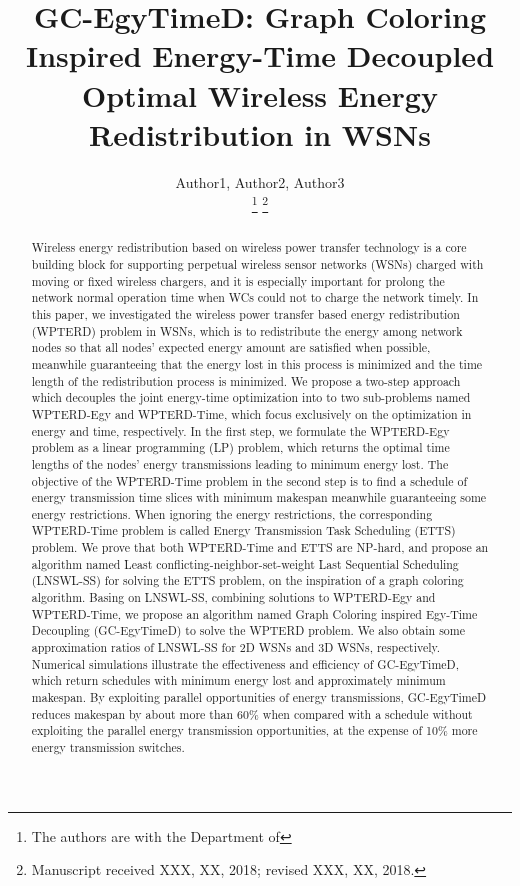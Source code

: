 \documentclass[journal,10pt]{IEEEtran}
\begin{document}
\title{GC-EgyTimeD: Graph Coloring Inspired Energy-Time Decoupled Optimal Wireless Energy Redistribution in WSNs}


\author{Author1, Author2, Author3

\thanks{The authors are with the Department of }%
\thanks{Manuscript received XXX, XX, 2018; revised XXX, XX, 2018.}}

{}


\maketitle


\begin{abstract}
Wireless energy redistribution based on wireless power transfer technology is a core building block for supporting perpetual wireless sensor networks (WSNs) charged with moving or fixed wireless chargers, and it is especially important for prolong the network normal operation time when WCs could not to charge the network timely. In this paper, we investigated the wireless power transfer based energy redistribution (WPTERD) problem in WSNs, which is to redistribute the energy among network nodes so that all nodes' expected energy amount are satisfied when possible, meanwhile guaranteeing that the energy lost in this process is minimized and the time length of the redistribution process is minimized. We propose a two-step approach which decouples the joint energy-time optimization into to two sub-problems named WPTERD-Egy and WPTERD-Time, which focus exclusively on the optimization in energy and time, respectively. In the first step, we formulate the WPTERD-Egy problem as a linear programming (LP) problem, which returns the optimal time lengths of the nodes' energy transmissions leading to minimum energy lost. The objective of the WPTERD-Time problem in the second step is to find a schedule of energy transmission time slices with minimum makespan meanwhile guaranteeing some energy restrictions. When ignoring the energy restrictions, the corresponding WPTERD-Time problem is called Energy Transmission Task Scheduling (ETTS) problem. We prove that both WPTERD-Time and ETTS are NP-hard, and propose an algorithm named Least conflicting-neighbor-set-weight Last Sequential Scheduling (LNSWL-SS) for solving the ETTS problem, on the inspiration of a graph coloring algorithm.
Basing on LNSWL-SS, combining solutions to WPTERD-Egy and WPTERD-Time, we propose an algorithm named Graph Coloring inspired Egy-Time Decoupling (GC-EgyTimeD) to solve the WPTERD problem. We also obtain some approximation ratios of LNSWL-SS for 2D WSNs and 3D WSNs, respectively.  Numerical simulations illustrate the effectiveness and efficiency of GC-EgyTimeD, which return schedules with minimum energy lost and approximately minimum makespan. By exploiting parallel opportunities of energy transmissions, GC-EgyTimeD reduces makespan by about more than 60\% when compared with a schedule without exploiting the parallel energy transmission opportunities, at the expense of 10\% more energy transmission switches.
\end{abstract}
\end{document}
